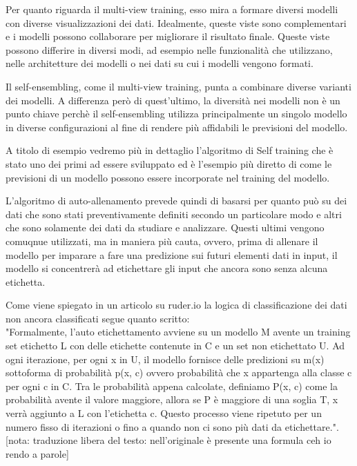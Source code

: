 \documentclass[12pt,italian]{report}
\begin{document}
Per quanto riguarda il multi-view training, esso mira a formare diversi modelli con diverse visualizzazioni dei dati. Idealmente, queste viste sono complementari e i modelli possono collaborare per migliorare il risultato finale. Queste viste possono differire in diversi modi, ad esempio nelle funzionalità che utilizzano, nelle architetture dei modelli o nei dati su cui i modelli vengono formati.

Il self-ensembling, come il multi-view training, punta a combinare diverse varianti dei modelli. A differenza però di quest'ultimo, la diversità nei modelli non è un punto chiave perchè il self-ensembling utilizza principalmente un singolo modello in diverse configurazioni al fine di rendere più affidabili le previsioni del modello. 

A titolo di esempio vedremo più in dettaglio l'algoritmo di Self training che è stato uno dei primi ad essere sviluppato ed è l'esempio più diretto di come le previsioni di un modello possono essere incorporate nel training del modello.

L'algoritmo di auto-allenamento prevede quindi di basarsi per quanto può su dei dati che sono stati preventivamente definiti secondo un particolare modo e altri che sono solamente dei dati da studiare e analizzare. Questi ultimi vengono comuqnue utilizzati, ma in maniera più cauta, ovvero, prima di allenare il modello per imparare a fare una predizione sui futuri elementi dati in input, il modello si concentrerà ad etichettare gli input che ancora sono senza alcuna etichetta.

Come viene spiegato in un articolo su ruder.io %
la logica di classificazione dei dati non ancora classificati segue quanto scritto:		\\
"Formalmente, l'auto etichettamento avviene su un modello M avente un training set etichetto L con delle etichette contenute in C e un set non etichettato U. Ad ogni iterazione, per ogni x in U, il modello fornisce delle predizioni su m(x) sottoforma di probabilità p(x, c) ovvero probabilità che x appartenga alla classe c per ogni c in C. Tra le probabilità appena calcolate, definiamo P(x, c) come la probabilità avente il valore maggiore, allora se P è maggiore di una soglia T, x verrà aggiunto a L con l'etichetta c. Questo processo viene ripetuto per un numero fisso di iterazioni o fino a quando non ci sono più dati da etichettare.".[nota: traduzione libera del testo: nell'originale è presente una formula ceh io rendo a parole]
\end{document}
